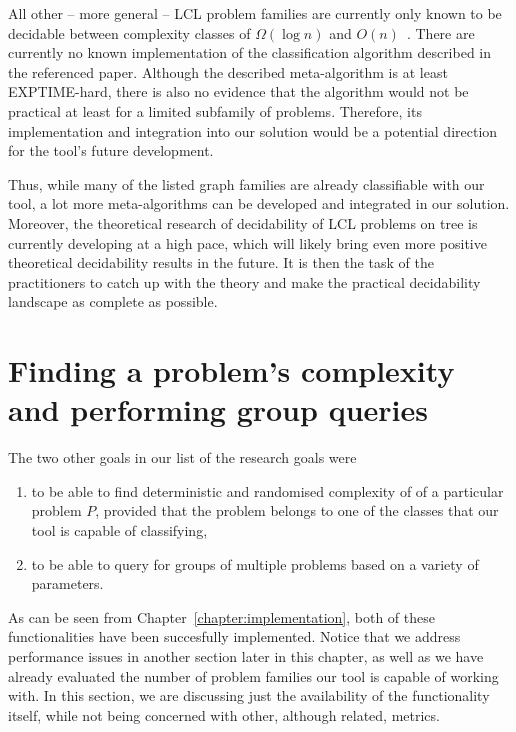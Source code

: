 All other -- more general -- LCL problem families
are currently only known to be decidable between complexity classes of
$\Omega(\log n)$ and $O(n)$~\cite{Chang2020a}. There are currently
no known implementation of the classification algorithm described in the
referenced paper. Although the described meta-algorithm is at least
EXPTIME-hard, there is also no evidence that the algorithm would not be
practical at least for a limited subfamily of problems. Therefore, its
implementation and integration into our solution would be a potential
direction for the tool's future development.

Thus, while many of the listed graph families are already classifiable
with our tool, a lot more meta-algorithms can be developed
and integrated in our solution. Moreover, the theoretical
research of decidability of LCL problems on tree is currently
developing at a high pace, which will likely bring even more
positive theoretical decidability results in the future.
It is then the task of the practitioners to catch up with
the theory and make the practical decidability landscape
as complete as possible.

\section{Finding a problem's complexity and performing group queries}

The two other goals in our list of the research goals were

\begin{enumerate}
  \item to be able to find deterministic and randomised complexity of
  of a particular problem $P$, provided that the problem belongs to
  one of the classes that our tool is capable of classifying,
  \item to be able to query for groups of multiple problems based
  on a variety of parameters.
\end{enumerate}

As can be seen from Chapter~\ref{chapter:implementation},
both of these functionalities have been succesfully implemented.
Notice that
we address performance issues in another section later in
this chapter, as well as
we have already evaluated the number of
problem families our tool is capable of working with. In this section,
we are discussing just the availability of the functionality itself, while not
being concerned with other, although related, metrics.


